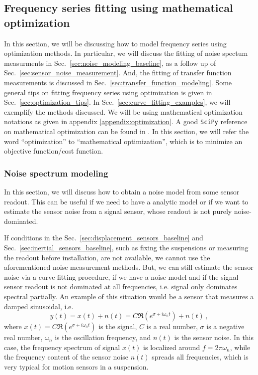 \subsection{Frequency series fitting using mathematical optimization}
In this section, we will be discussing how to model frequency series using optimization methods.
In particular, we will discuss the fitting of noise spectum measurments in Sec.~\ref{sec:noise_modeling_baseline}, as a follow up of Sec.~\ref{sec:sensor_noise_measurement}.
And, the fitting of transfer function measurements is discussed in Sec.~\ref{sec:transfer_function_modeling}.
Some general tips on fitting frequency series using optimization is given in Sec.~\ref{sec:optimization_tips}.
In Sec.~\ref{sec:curve_fitting_examples}, we will exemplify the methods discussed.
We will be using mathematical optimization notations as given in appendix \ref{appendix:optimization}.
A good \verb|SciPy| reference on mathematical optimization can be found in \cite{scipy_mathematical_optimization}.
In this section, we will refer the word ``optimization'' to ``mathematical optimization'', which is to minimize an objective function/cost function.
\subsubsection{Noise spectrum modeling \label{sec:noise_modeling_baseline}}
In this section, we will discuss how to obtain a noise model from some sensor readout.
This can be useful if we need to have a analytic model or if we want to estimate the sensor noise from a signal sensor, whose readout is not purely noise-dominated.

If conditions in the Sec.~\ref{sec:displacement_sensors_baseline} and Sec.~\ref{sec:inertial_sensors_baseline}, such as fixing the suspensions or measuring the readout before installation, are not available, we cannot use the aforementioned noise measurement methods.
But, we can still estimate the sensor noise via a curve fitting procedure, if we have a noise model and if the signal sensor readout is not dominated at all frequencies, i.e. signal only dominates spectral partially.
An example of this situation would be a sensor that measures a damped sinusoidal, i.e.
\begin{equation}
	y(t) = x(t) + n(t) = C\Re{\left(e^{\sigma+i\omega_n t}\right)} + n(t)\,,
	\label{eqn:sensor_readout_damp_sinusoidal}
\end{equation}
where $x(t) = C\Re{\left(e^{\sigma+i\omega_n t}\right)}$ is the signal, $C$ is a real number, $\sigma$ is a negative real number, $\omega_n$ is the oscillation frequency, and $n(t)$ is the sensor noise.
In this case, the frequency spectrum of signal $x(t)$ is localized around $f=2\pi\omega_n$, while the frequency content of the sensor noise $n(t)$ spreads all frequencies, which is very typical for motion sensors in a suspension.

